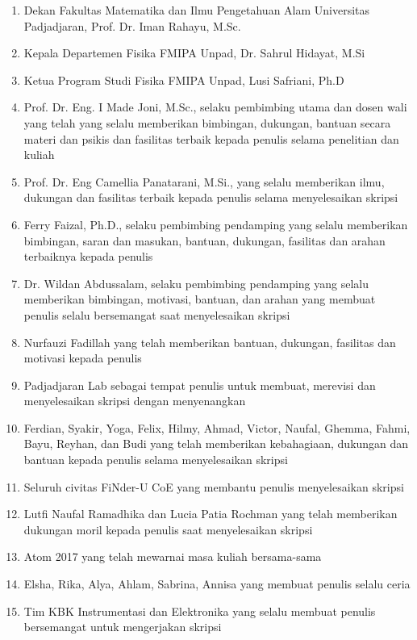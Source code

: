 \documentclass[12pt,a4paper]{report}
\begin{document}
\begin{enumerate}
	\item Dekan Fakultas Matematika dan Ilmu Pengetahuan Alam Universitas Padjadjaran, Prof. Dr. Iman Rahayu, M.Sc.
	\item Kepala Departemen Fisika FMIPA Unpad, Dr. Sahrul Hidayat, M.Si
	\item Ketua Program Studi Fisika FMIPA Unpad, Lusi Safriani, Ph.D
	\item Prof. Dr. Eng. I Made Joni, M.Sc., selaku pembimbing utama dan dosen wali yang telah yang selalu memberikan bimbingan, dukungan, bantuan secara materi dan psikis dan fasilitas terbaik kepada penulis selama penelitian dan kuliah
	\item Prof. Dr. Eng Camellia Panatarani, M.Si., yang selalu memberikan ilmu, dukungan dan fasilitas terbaik kepada penulis selama menyelesaikan skripsi
	\item Ferry Faizal, Ph.D., selaku pembimbing pendamping yang selalu memberikan bimbingan, saran dan masukan, bantuan, dukungan, fasilitas dan arahan terbaiknya kepada penulis
	\item Dr. Wildan Abdussalam, selaku pembimbing pendamping yang selalu memberikan bimbingan, motivasi, bantuan, dan arahan yang membuat penulis selalu bersemangat saat menyelesaikan skripsi
	\item Nurfauzi Fadillah yang telah memberikan bantuan, dukungan, fasilitas dan motivasi kepada penulis
	\item Padjadjaran Lab sebagai tempat penulis untuk membuat, merevisi dan menyelesaikan skripsi dengan menyenangkan
	\item Ferdian, Syakir, Yoga, Felix, Hilmy, Ahmad, Victor, Naufal, Ghemma, Fahmi, Bayu, Reyhan, dan Budi yang telah memberikan kebahagiaan, dukungan dan bantuan kepada penulis selama menyelesaikan skripsi
	\item Seluruh civitas FiNder-U CoE yang membantu penulis menyelesaikan skripsi
	\item Lutfi Naufal Ramadhika dan Lucia Patia Rochman yang telah memberikan dukungan moril kepada penulis saat menyelesaikan skripsi
	\item Atom 2017 yang telah mewarnai masa kuliah bersama-sama
	\item Elsha, Rika, Alya, Ahlam, Sabrina, Annisa yang membuat penulis selalu ceria
	\item Tim KBK Instrumentasi dan Elektronika yang selalu membuat penulis bersemangat untuk mengerjakan skripsi
\end{enumerate}
\end{document}
